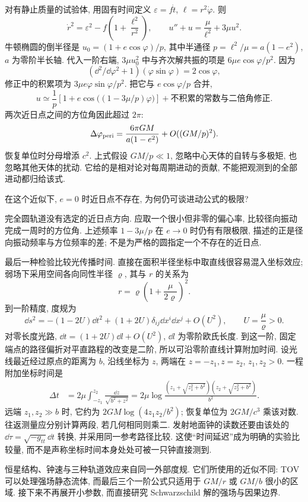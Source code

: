
对有静止质量的试验体, 用固有时间定义 $\varepsilon=f\dot t$, $\ell=r^2\dot\varphi$. 则
\[
 \dot r^2=\varepsilon^2-f\left(1+\frac{\ell^2}{r^2}\right),\qquad
 u''+u=\frac\mu{\ell^2}+3\mu u^2.
\]
牛顿椭圆的倒半径是 $u_0=(1+e\cos\varphi)/p$, 其中半通径 $p=\ell^2/\mu=a(1-e^2)$, $a$ 为零阶半长轴. 代入一阶右端, $3\mu u_0^2$ 中与齐次解共振的项是 $6\mu e\cos\varphi/p^2$. 因为
\[
 (\dd^2/\dd\varphi^2+1)(\varphi\sin\varphi)=2\cos\varphi,
\]
修正中的积累项为 $3\mu e\varphi\sin\varphi/p^2$. 把它与 $e\cos\varphi/p$ 合并,
\[
 u\simeq\frac1p\left[1+e\cos\bigl((1-3\mu/p)\varphi\bigr)\right]
       +\text{不积累的常数与二倍角修正}.
\]
两次近日点之间的方位角因此超过 $2\pi$:
\begin{equation}
 \Delta\varphi_{\rm peri}=\frac{6\pi GM}{a(1-e^2)}
          +O((GM/p)^2).
 \label{eq:gr-perihelion}
\end{equation}
恢复单位时分母增添 $c^2$. 上式假设 $GM/p\ll1$, 忽略中心天体的自转与多极矩, 也忽略其他天体的扰动. 它给的是相对论对每周期进动的贡献, 不能把观测到的全部进动都归给该式.

\begin{example}
 在这个近似下, $e=0$ 时近日点不存在, 为何仍可谈进动公式的极限?
\end{example}
\begin{solution}
 完全圆轨道没有选定的近日点方向. 应取一个很小但非零的偏心率, 比较径向振动完成一周时的方位角. 上述频率 $1-3\mu/p$ 在 $e\to0$ 时仍有有限极限, 描述的正是径向振动频率与方位频率的差; 不是为严格的圆指定一个不存在的近日点.
\end{solution}


最后一种检验比较光传播时间. 直接在面积半径坐标中取直线很容易混入坐标效应; 弱场下采用空间各向同性半径 $\varrho$, 其与 $r$ 的关系为
\[
 r=\varrho\left(1+\frac\mu{2\varrho}\right)^2.
\]
到一阶精度, 度规为
\[
 \dd s^2=-(1-2U)\dd t^2+(1+2U)\delta_{ij}\dd x^i\dd x^j
       +O(U^2),\qquad U=\frac\mu\varrho>0.
\]
对零长度光路, $\dd t=(1+2U)\dd l+O(U^2)$, $\dd l$ 为零阶欧氏长度. 到这一阶, 固定端点的路径偏折对平直路程的改变是二阶, 所以可沿零阶直线计算附加时间. 设光线最近经过原点的距离为 $b$, 沿线坐标为 $z$, 两端在 $z=-z_1,z=z_2$, $z_1,z_2>0$. 一程附加坐标时间是
\begin{align}
 \Delta t&=2\mu\int_{-z_1}^{z_2}\frac{\dd z}{\sqrt{b^2+z^2}}
 =2\mu\log\frac{(z_1+\sqrt{z_1^2+b^2})(z_2+\sqrt{z_2^2+b^2})}{b^2}.
 \label{eq:gr-shapiro}
\end{align}
远端 $z_1,z_2\gg b$ 时, 它约为 $2GM\log(4z_1z_2/b^2)$; 恢复单位为 $2GM/c^3$ 乘该对数. 往返测量应分别计算两段, 若几何相同则乘二. 发射地面钟的读数还要由该处的 $\dd\tau=\sqrt{-g_{tt}}\dd t$ 转换, 并采用同一参考路径比较. 这使“时间延迟”成为明确的实验比较量, 而不是声称坐标时间本身处处可被一只钟直接测到.

恒星结构、钟速与三种轨道效应来自同一外部度规. 它们所使用的近似不同: TOV 可以处理强场静态流体, 而最后三个一阶公式只适用于 $GM/r$ 或 $GM/b$ 很小的区域. 接下来不再展开小参数, 而直接研究 Schwarzschild 解的强场与因果边界.

